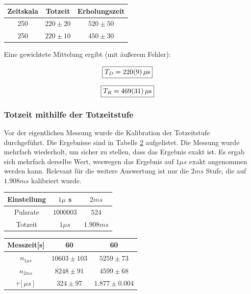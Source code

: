\documentclass[12pt,a4paper]{article}
\begin{document}
\begin{table}
\centering
\begin{tabular}{|c|c|c|}
\hline
Zeitskala & Totzeit & Erholungszeit\\
\hline 
250 & $220\pm 20$ & $520\pm 50$ \\
\hline 
250 & $220\pm 10$ & $450\pm 30$ \\
\hline
\end{tabular}
\label{teb:Stever}
\end{table}

Eine gewichtete Mittelung ergibt (mit äußerem Fehler):

\begin{equation}
\boxed{T_D = \SI{220 \pm 9}{\mu s}}
\end{equation}

\begin{equation}
\boxed{T_R = \SI{469 \pm 31}{\mu s}}
\end{equation}

\subsubsection{Totzeit mithilfe der Totzeitstufe}

Vor der eigentlichen Messung wurde die Kalibration der Totzeitstufe durchgeführt. Die Ergebnisse sind in Tabelle \ref{tab:Totzeitkalibration} aufgelistet. Die Messung wurde mehrfach wiederholt, um sicher zu stellen, dass das Ergebnis exakt ist. Es ergab sich mehrfach derselbe Wert, weswegen das Ergebnis auf $1\mu s$ exakt angenommen werden kann. Relevant für die weitere Auswertung ist nur die $2ms$ Stufe, die auf $1.908ms$ kalibriert wurde.

\begin{table}
\centering
\begin{tabular}{|c|c||c|}
\hline
Einstellung & $1\mu$ s & $2ms$\\
\hline 
Pulsrate & $1000003$ & $524$ \\
\hline 
Totzeit & $1\mu s$ & $1.908ms$ \\
\hline
\end{tabular}
\label{tab:Totzeitkalibration}
\end{table}

\begin{table}
\centering
\begin{tabular}{|c|c||c|}
\hline
Messzeit[s] & 60 & 60\\
\hline 
$n_{1\mu s}$ & $10603 \pm 103$ & $5259\pm 73$ \\
\hline 
$n_{2ms}$ & $8248\pm 91$ & $4599\pm 68$ \\
\hline 
$\tau [\mu s]$ & $324\pm 97 $ & $1.877\pm 0.004$ \\
\hline
\end{tabular}
\label{tab:Totzeitstufe}
\end{table}
\end{document}
